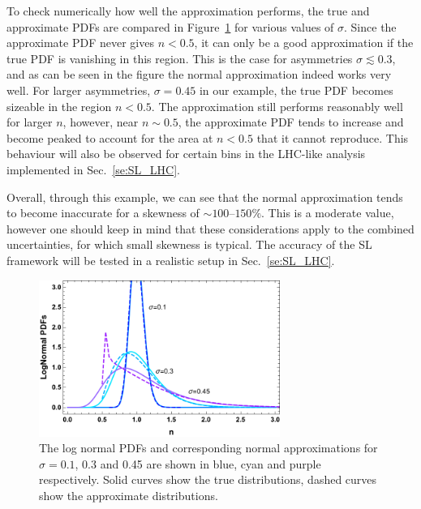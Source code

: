 \documentclass[11pt]{article}
\begin{document}
To check numerically how well the approximation performs, the true and approximate PDFs are compared in Figure~\ref{fig:approxs} for various values of $\sigma$.  
Since the approximate PDF never gives $n<0.5$, it can only be a good approximation if the true PDF is vanishing in this region. This is the case for
asymmetries $\sigma \lesssim 0.3$, and as can be seen in the figure the normal approximation indeed works very well.
For larger asymmetries, $\sigma = 0.45$ in our example, the true PDF becomes sizeable in the region $n<0.5$. 
The approximation still performs reasonably well for larger $n$, however, near $n\sim 0.5$, 
the approximate PDF tends to increase and become peaked to account for the area at $n<0.5$ that it cannot reproduce. 
This behaviour will also be observed for certain bins in the LHC-like analysis implemented in Sec.~\ref{se:SL_LHC}.

Overall, through this example, we can see that the normal approximation tends to become inaccurate for a skewness of $\sim 100$--$150\%$. 
This is a moderate value, however one should keep in mind that these considerations apply to the combined uncertainties, for which small skewness is typical. The accuracy of the SL framework will be tested in a realistic setup in Sec.~\ref{se:SL_LHC}.


\begin{figure}[t]
\begin{center}
\includegraphics[width=0.7\textwidth]{figures/PlotLogNormal.pdf}
\end{center}
\caption{\label{fig:approxs} 
The log normal PDFs and corresponding normal approximations for $\sigma = 0.1$, 0.3 and 0.45 are shown in blue, cyan and purple respectively. Solid curves show the true distributions, dashed curves show the approximate distributions. 
}
\end{figure}




\end{document}
